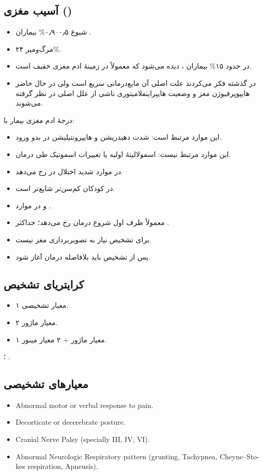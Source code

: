 \documentclass[12pt,a4paper]{article}
\begin{document}
\subsection*{آسیب مغزی ()}
\begin{itemize}
\item شیوع ۰٫۵–۰٫۹\% بیماران .
\item مرگ‌ومیر ۲۴\%.
\item در حدود ۱۵\% بیماران ،  دیده می‌شود که معمولاً در زمینهٔ ادم مغزی خفیف است.
\item در گذشته فکر می‌کردند علت اصلی آن مایع‌درمانی سریع است ولی در حال حاضر هایپوپرفیوژن مغز و وضعیت هایپراینفلامیتوری ناشی از  علل اصلی در نظر گرفته می‌شوند.
\end{itemize}
درجهٔ ادم مغزی بیمار  با:
\begin{itemize}
\item این موارد مرتبط است: شدت دهیدریشن و هایپرونتیلیشن در بدو ورود.
\item این موارد مرتبط نیست: اسمولالیتهٔ اولیه یا تغییرات اسموتیک طی درمان.
\end{itemize}
\begin{itemize}
\item در موارد شدید  اختلال در  رخ می‌دهد.
\item {} در کودکان کم‌سن‌تر شایع‌تر است.
\item و در موارد .
\item معمولاً ظرف  اول شروع درمان رخ می‌دهد؛ حداکثر .
\item برای تشخیص نیاز به تصویربرداری مغز نیست.
\item پس از تشخیص باید بلافاصله درمان آغاز شود.
\end{itemize}

\subsection*{کرایتریای تشخیص }
\begin{itemize}
\item ۱ معیار تشخیصی.
\item ۲ معیار ماژور.
\item ۱ معیار ماژور + ۲ معیار مینور.
\end{itemize}
؛ .
\subsection*{معیارهای تشخیصی}
\begin{latin}
\begin{itemize}
\item Abnormal motor or verbal response to pain.
\item Decorticate or decerebrate posture.
\item Cranial Nerve Palsy (specially III, IV, VI).
\item Abnormal Neurologic Respiratory pattern (grunting, Tachypnea, Cheyne--Stokes respiration, Apneusis).
\end{itemize}
\end{latin}
\end{document}
